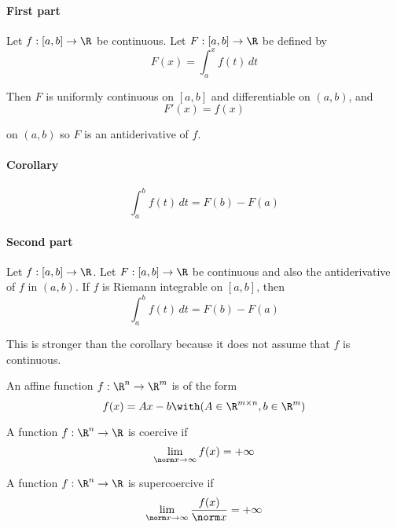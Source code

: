 
\label{b869dc0}

\paragraph{First part} Let $f:[a,b]\to\R$ be continuous. Let $F:[a,b]\to\R$ be defined by
$$F(x)=\int_a^xf(t)\,dt$$

Then $F$ is uniformly continuous on $[a,b]$ and differentiable on $(a,b)$, and
$$F'(x)=f(x)$$

on $(a,b)$ so $F$ is an antiderivative of $f$.

\paragraph{Corollary}
$$\int_a^bf(t)\,dt=F(b)-F(a)$$

\paragraph{Second part} Let $f:[a,b]\to\R$. Let $F:[a,b]\to\R$ be continuous and also the
antiderivative of $f$ in $(a,b)$. If $f$ is Riemann integrable on $[a,b]$, then
$$\int_a^bf(t)\,dt=F(b)-F(a)$$

This is stronger than the corollary because it does not assume that $f$ is
continuous.


\label{dcb7f73}

An affine function $f:\R^n\to\R^m$ is of the form
$$
  f(x)=Ax-b\with(A\in\R^{m\times n},b\in\R^m)
$$

\label{e9c7871}

A function $f:\R^n\to\R$ is coercive if
$$
  \lim_{\norm x\to\infty}f(x)=+\infty
$$

\label{a0444cc}

A function $f:\R^n\to\R$ is supercoercive if
$$
  \lim_{\norm x\to\infty}\frac{f(x)}{\norm x}=+\infty
$$

